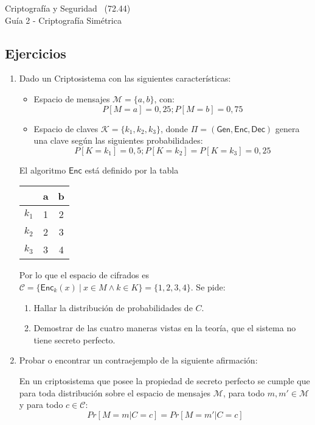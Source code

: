 \documentclass[]{book}
\theoremstyle{definition}
\begin{document}
\begin{center}
  {\Large Criptografía y Seguridad \the\year~(72.44)\\[.2cm]
Guía 2 - Criptografía Simétrica}\\
\end{center}

\vspace{0.2 cm}

\subsection*{Ejercicios}
\begin{enumerate}
\item Dado un Criptosistema con las siguientes características:
  \begin{itemize}
    \item Espacio de mensajes $\mathcal{M} =\{a, b\}$, con:
      \[P [M=a] =0,25; P[M=b]=0,75\]
  \item Espacio de claves $\mathcal{K} = \{k_1,k_2,k_3\}$, donde $\Pi = (\mathsf{Gen}, \mathsf{Enc}, \mathsf{Dec})$ genera una clave según las siguientes probabilidades:
    \[P[K=k_1]=0,5 ; P[K=k_2]=P[K=k_3]=0,25\]
  \end{itemize}
  El algoritmo $\mathsf{Enc}$ está definido por la tabla


\begin{tabular}{c|cc}
    & a & b \\ \hline
$k_1$ & 1 & 2 \\
$k_2$ & 2 & 3 \\
$k_3$ & 3 & 4 \\
\end{tabular}

Por lo que el espacio de cifrados es $\mathcal{C}=\{ \mathsf{Enc}_k(x)~|~x \in M
\land k \in K\} = \{1,2,3,4\}$. Se pide:
\begin{enumerate}
\item Hallar la distribución de probabilidades de $C$.
\item Demostrar de las cuatro maneras vistas en la teoría, que el sistema no tiene secreto perfecto.
\end{enumerate}
\item Probar o encontrar un contraejemplo de la siguiente afirmación:

En un criptosistema que posee la propiedad de secreto perfecto se cumple que
para toda distribución sobre el espacio de mensajes $\mathcal{M}$, para todo
$m,m' \in \mathcal{M}$ y para todo $c\in \mathcal{C}$:
\[Pr[M=m|C=c] = Pr[M=m'|C=c]\]


\end{enumerate}
\end{document}
